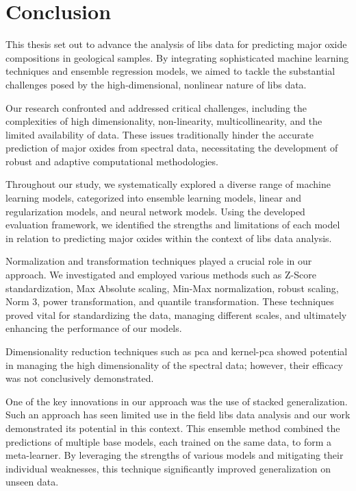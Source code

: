 \section{Conclusion}\label{sec:conclusion}
This thesis set out to advance the analysis of \gls{libs} data for predicting major oxide compositions in geological samples.
By integrating sophisticated machine learning techniques and ensemble regression models, we aimed to tackle the substantial challenges posed by the high-dimensional, nonlinear nature of \gls{libs} data.

Our research confronted and addressed critical challenges, including the complexities of high dimensionality, non-linearity, multicollinearity, and the limited availability of data.
These issues traditionally hinder the accurate prediction of major oxides from spectral data, necessitating the development of robust and adaptive computational methodologies.

Throughout our study, we systematically explored a diverse range of machine learning models, categorized into ensemble learning models, linear and regularization models, and neural network models.
Using the developed evaluation framework, we identified the strengths and limitations of each model in relation to predicting major oxides within the context of \gls{libs} data analysis.

Normalization and transformation techniques played a crucial role in our approach.
We investigated and employed various methods such as Z-Score standardization, Max Absolute scaling, Min-Max normalization, robust scaling, Norm 3, power transformation, and quantile transformation.
These techniques proved vital for standardizing the data, managing different scales, and ultimately enhancing the performance of our models.

Dimensionality reduction techniques such as \gls{pca} and \gls{kernel-pca} showed potential in managing the high dimensionality of the spectral data; however, their efficacy was not conclusively demonstrated.

One of the key innovations in our approach was the use of stacked generalization.
Such an approach has seen limited use in the field \gls{libs} data analysis and our work demonstrated its potential in this context.
This ensemble method combined the predictions of multiple base models, each trained on the same data, to form a meta-learner.
By leveraging the strengths of various models and mitigating their individual weaknesses, this technique significantly improved generalization on unseen data.


